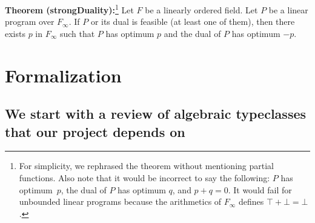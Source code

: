 \documentclass[]{article}
\renewcommand{\.}{\hskip .75pt}
\begin{document}
\medskip \noindent
\textbf{Theorem (strongDuality):}\footnote{For simplicity,
we rephrased the theorem without mentioning partial functions.
Also note that it would be incorrect to say the following:
$P$ has optimum~$p$, the dual of $P$ has optimum $q$, and $p + q = 0$.
It would fail for unbounded linear programs because the arithmetics
of $F_\infty$ defines $\top + \bot = \bot$.}
Let $F$ be a linearly ordered field.
Let $P$ be a linear program over $F_\infty$.
If $P$ or its dual is feasible (at least one of them),
then there exists $p$ in $F_\infty$ such that
$P$ has optimum $p$ and the dual of $P$ has optimum $-p$.

\section{Formalization}

\subsection{We start with a review of algebraic typeclasses that our project depends on}
\end{document}
